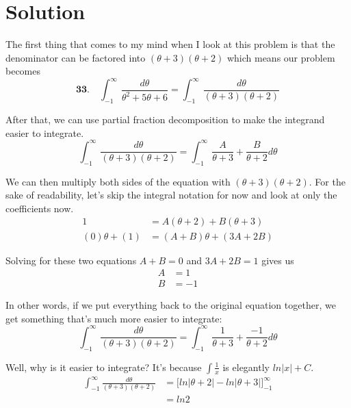 
\section*{Solution}
The first thing that comes to my mind
when I look at this problem is that
the denominator can be factored into
$ (\theta + 3)(\theta + 2) $ which
means our problem becomes
\begin{equation}
	\textbf{33.}\quad \int_{-1}^{\infty} 
	\frac{d\theta}{\theta^2+5\theta+6}
	=
	\int_{-1}^{\infty} 
	\frac{d\theta}{(\theta + 3)(\theta + 2)}	
\end{equation}

After that, we can use partial fraction decomposition
to make the integrand easier to integrate.
\begin{equation}
	\int_{-1}^{\infty} 
	\frac{d\theta}{(\theta + 3)(\theta + 2)}
	=
	\int_{-1}^{\infty} 
	\frac{A}{\theta + 3} + \frac{B}{\theta + 2} d\theta
\end{equation}

We can then multiply both sides of the
equation with $ (\theta + 3)(\theta + 2) $.
For the sake of readability, let's 
skip the integral notation for now
and look at only the coefficients now.
\begin{align}
	1
	&=
	A(\theta + 2) + B(\theta + 3) \\
	(0)\theta + (1)
	&=
	(A+B)\theta + (3A + 2B)
\end{align}

Solving for these two equations
$ A + B = 0 $ and 
$ 3A + 2B = 1 $ gives us
\begin{align}
	A &= 1 \\
	B &= -1
\end{align}

In other words, if we put everything 
back to the original equation together,
we get something that's much more easier
to integrate: 
\begin{equation*}
	\int_{-1}^{\infty} 
	\frac{d\theta}{(\theta + 3)(\theta + 2)}
	=
	\int_{-1}^{\infty} 
	\frac{1}{\theta + 3} + \frac{-1}{\theta + 2} d\theta
\end{equation*}

\newpage

Well, why is it easier to integrate?
It's because 
$ \int \frac{1}{x} $ is elegantly
$ ln|x| + C $.
\begin{align}
	\int_{-1}^{\infty} 
	\frac{d\theta}{(\theta + 3)(\theta + 2)}
	&=
	\Bigg[
	  ln|\theta + 2| - ln|\theta + 3|
	\Bigg]_{-1}^{\infty} \\
	&=
	ln2
\end{align}

